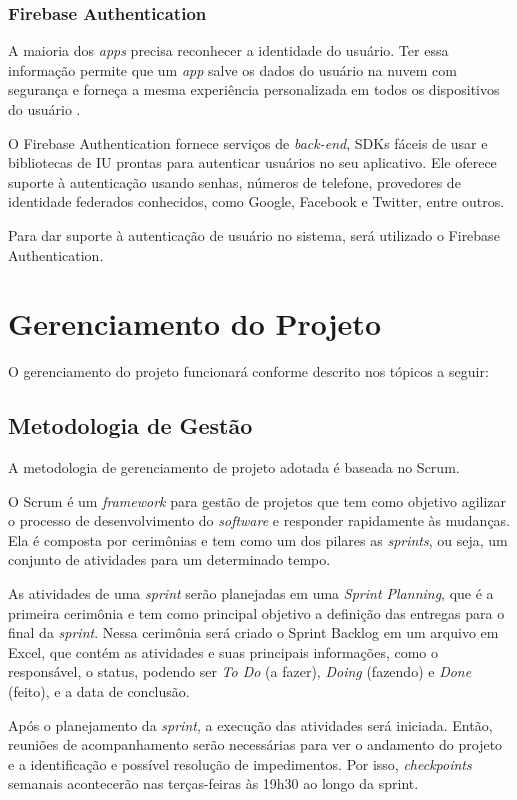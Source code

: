 \documentclass[
    12pt,               %
    openright,          %
    oneside,
    a4paper,            %
    paginasA3,  %
    MODELO,             %
    TODO,               %
    english,            %
    brazil              %
    ]{ifsp-spo-inf-ctds} %
\begin{document}
\subsection{Firebase Authentication}
A maioria dos \textit{apps} precisa reconhecer a identidade do usuário. Ter essa informação permite que um \textit{app} salve os dados do usuário na nuvem com segurança e forneça a mesma experiência personalizada em todos os dispositivos do usuário \cite{authentication:2020}.

O Firebase Authentication fornece serviços de \textit{back-end}, SDKs fáceis de usar e bibliotecas de IU prontas para autenticar usuários no seu aplicativo. Ele oferece suporte à autenticação usando senhas, números de telefone, provedores de identidade federados conhecidos, como Google, Facebook e Twitter, entre outros.

Para dar suporte à autenticação de usuário no sistema, será utilizado o Firebase Authentication.

\chapter{Gerenciamento do Projeto}
O gerenciamento do projeto funcionará conforme descrito nos tópicos a seguir: 

\section{Metodologia de Gestão}
A metodologia de gerenciamento de projeto adotada é baseada no Scrum.

O Scrum é um \textit{framework} para gestão de projetos que tem como objetivo agilizar o processo de desenvolvimento do \textit{software} e responder rapidamente às mudanças. Ela é composta por cerimônias e tem como um dos pilares as \textit{sprints}, ou seja, um conjunto de atividades para um determinado tempo. 

As atividades de uma \textit{sprint} serão planejadas em uma \textit{Sprint Planning}, que é a primeira cerimônia e tem como principal objetivo a definição das entregas para o final da \textit{sprint}. Nessa cerimônia será criado o Sprint Backlog em um arquivo em Excel, que contém as atividades e suas principais informações, como o responsável, o status, podendo ser \textit{To Do} (a fazer), \textit{Doing} (fazendo) e \textit{Done} (feito), e a data de conclusão. 

Após o planejamento da \textit{sprint}, a execução das atividades será iniciada. Então, reuniões de acompanhamento serão necessárias para ver o andamento do projeto e a identificação e possível resolução de impedimentos. Por isso, \textit{checkpoints} semanais acontecerão nas terças-feiras às 19h30 ao longo da sprint.
\end{document}
